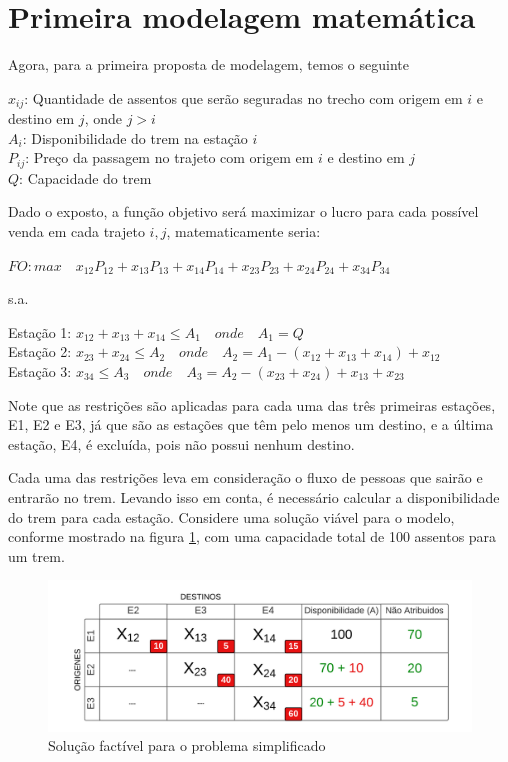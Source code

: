 \section{Primeira modelagem matemática}\label{sec:modelo1}

Agora, para a primeira proposta de modelagem, temos o seguinte

\noindent $x_{ij}$: Quantidade de assentos que serão seguradas no trecho com origem em $i$ e destino em $j$, onde $j>i$ \\
\noindent $A_i$: Disponibilidade do trem na estação $i$ \\
\noindent $P_{ij}$: Preço da passagem no trajeto com origem em $i$ e destino em $j$ \\
\noindent $Q$: Capacidade do trem

Dado o exposto, a função objetivo será maximizar o lucro para cada possível venda em cada trajeto $i,j$, matematicamente seria:

$FO: max \quad x_{12}P_{12} + x_{13}P_{13} + x_{14}P_{14} + x_{23}P_{23} + x_{24}P_{24} + x_{34}P_{34}$

s.a.

Estação 1: $x_{12} + x_{13} + x_{14} \leq A_1 \quad onde \quad A_1 = Q $ \\
\indent Estação 2: $x_{23} + x_{24}  \leq  A_2 \quad onde \quad A_2 = A_1 - (x_{12} + x_{13} + x_{14}) + x_{12} $ \\
\indent Estação 3: $x_{34} \leq A_3 \quad onde \quad A_3 = A_2 - (x_{23} + x_{24}) + x_{13} + x_{23} $

Note que as restrições são aplicadas para cada uma das três primeiras estações, E1, E2 e E3, já que são as estações que têm pelo menos um destino, e a última estação, E4, é excluída, pois não possui nenhum destino.

Cada uma das restrições leva em consideração o fluxo de pessoas que sairão e entrarão no trem. Levando isso em conta, é necessário calcular a disponibilidade do trem para cada estação. Considere uma solução viável para o modelo, conforme mostrado na figura \ref{fig: fig2}, com uma capacidade total de 100 assentos para um trem.

\begin{figure}[!ht]
	\begin{center}
		\includegraphics[scale=0.4]{img/fig2.png}
		\caption{Solução factível para o problema simplificado}
		\label{fig: fig2}
	\end{center}
\end{figure}

